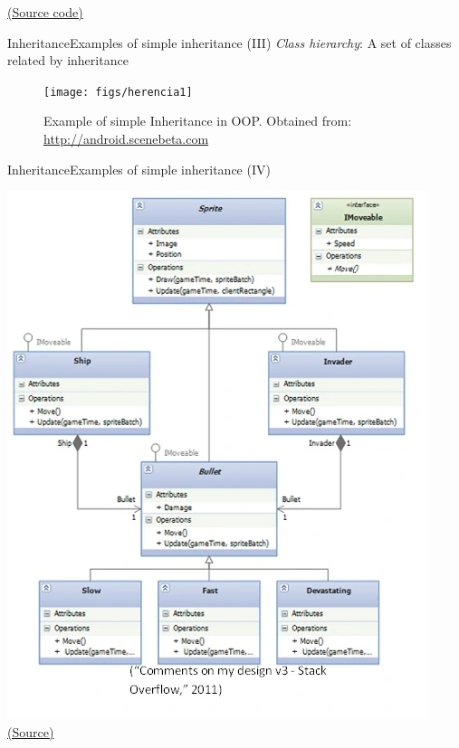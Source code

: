 \documentclass[10pt,compress]{beamer} %
\begin{document}
\begin{frame}[plain]%
	\begin{exampleblock}{}
	\vspace{-0.3cm} 
		
	\end{exampleblock}

	\href{https://gist.github.com/dfbarrero/9b30c749986885373c8c250b3901ec9d}{(Source code)}
\end{frame}

\begin{frame}{Inheritance}{Examples of simple inheritance (III)}
	\textit{Class hierarchy}: A set of classes related by inheritance  \\
	\begin{figure}
		\texttt{[image: figs/herencia1]}
		\caption{{\scriptsize Example of simple Inheritance in OOP. Obtained from: \url{http://android.scenebeta.com}}}
	\end{figure}
\end{frame}

\begin{frame}{Inheritance}{Examples of simple inheritance (IV)}
	\begin{center}
    	\centering \includegraphics[width=0.5\linewidth]{figs/class-diagram.png}\\
		\smallskip
		\tiny{\href{https://amysgamedevelopmentblog.wordpress.com/2016/10/17/requirements-for-a-game-why-is-planning-important/}{(Source)}}
	\end{center}
\end{frame}
\end{document}
